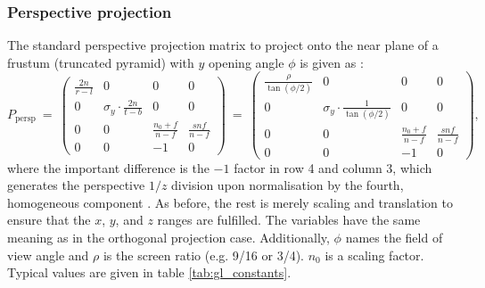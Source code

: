 \subsubsection{Perspective projection}
The standard perspective projection matrix to project onto the near plane of a frustum (truncated pyramid)
with $y$ opening angle $\phi$ is given as \cite{web_gl_perspective} \cite{web_gl_frustum} \cite[p. 81]{Sellers2002}:
\begin{equation}
	P_{\mathrm{persp}} \ =\
		\left( \begin{array}{cccc}
			\frac{2n}{r-l} &                              0 &                  0 &  0                 \\
			             0 &  \sigma_y \cdot \frac{2n}{t-b} &                  0 &  0                 \\
			             0 &                              0 &  \frac{n_0+f}{n-f} &  \frac{s n f}{n-f} \\
			             0 &                              0 &         \boxed{-1} &  0
		\end{array} \right) \ = \
		\left( \begin{array}{cccc}
			\frac{\rho}{\tan\left(\phi/2 \right)} &                                                  0 &                  0 &  0                 \\
			                                    0 &  \sigma_y \cdot \frac{1}{\tan\left(\phi/2 \right)} &                  0 &  0                 \\
			                                    0 &                                                  0 &  \frac{n_0+f}{n-f} &  \frac{s n f}{n-f} \\
			                                    0 &                                                  0 &         \boxed{-1} &  0
		\end{array} \right),
\end{equation}
where the important difference is the $-1$ factor in row 4 and column 3, which generates the perspective
$1/z$ division upon normalisation by the fourth, homogeneous component \cite[pp. 350-351]{Kuipers2002}.
As before, the rest is merely scaling and translation to ensure that the $x$, $y$, and $z$ ranges
are fulfilled.
The variables have the same meaning as in the orthogonal projection case.
Additionally, $\phi$ names the field of view angle and $\rho$ is the screen ratio (e.g. 9/16 or 3/4).
$n_0$ is a scaling factor. Typical values are given in table \ref{tab:gl_constants}.


